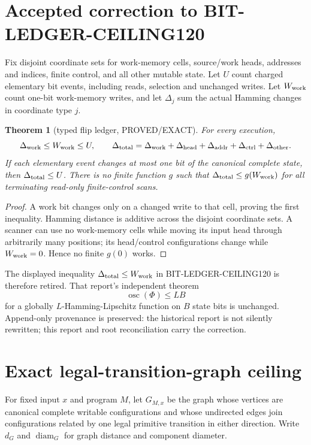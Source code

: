 \documentclass[11pt]{article}
\newtheorem{theorem}{Theorem}
\begin{document}
\section{Accepted correction to BIT-LEDGER-CEILING120}

Fix disjoint coordinate sets for work-memory cells, source/work heads,
addresses and indices, finite control, and all other mutable state.  Let $U$
count charged elementary bit events, including reads, selection and unchanged
writes.  Let $W_{\rm work}$ count one-bit work-memory writes, and let
$\Delta_j$ sum the actual Hamming changes in coordinate type $j$.

\begin{theorem}[typed flip ledger, PROVED/EXACT]
For every execution,
\[
 \Delta_{\rm work}\le W_{\rm work}\le U,
 \qquad
 \Delta_{\rm total}=
 \Delta_{\rm work}+\Delta_{\rm head}+\Delta_{\rm addr}
 +\Delta_{\rm ctrl}+\Delta_{\rm other}.
\]
If each elementary event changes at most one bit of the canonical complete
state, then $\Delta_{\rm total}\le U$.  There is no finite function $g$ such
that $\Delta_{\rm total}\le g(W_{\rm work})$ for all terminating read-only
finite-control scans.
\end{theorem}
\begin{proof}
A work bit changes only on a changed write to that cell, proving the first
inequality.  Hamming distance is additive across the disjoint coordinate
sets.  A scanner can use no work-memory cells while moving its input head
through arbitrarily many positions; its head/control configurations change
while $W_{\rm work}=0$.  Hence no finite $g(0)$ works.
\end{proof}

The displayed inequality $\Delta_{\rm total}\le W_{\rm work}$ in
BIT-LEDGER-CEILING120 is therefore retired.  That report's independent
theorem
\[
 \operatorname{osc}(\Phi)\le LB
\]
for a globally $L$-Hamming-Lipschitz function on $B$ state bits is unchanged.
Append-only provenance is preserved: the historical report is not silently
rewritten; this report and root reconciliation carry the correction.

\section{Exact legal-transition-graph ceiling}

For fixed input $x$ and program $M$, let $G_{M,x}$ be the graph whose vertices
are canonical complete writable configurations and whose undirected edges
join configurations related by one legal primitive transition in either
direction.  Write $d_G$ and $\operatorname{diam}_G$ for graph distance and
component diameter.
\end{document}
